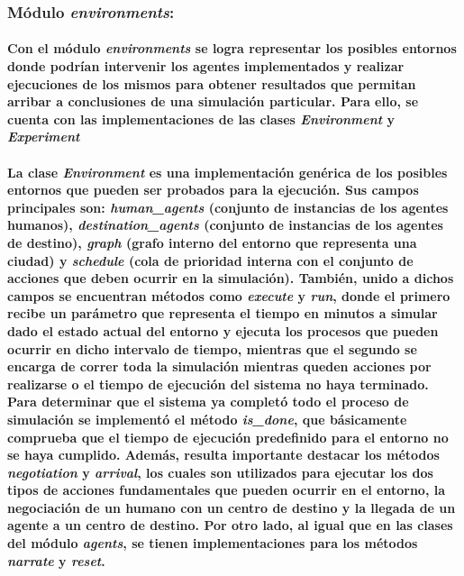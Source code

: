 \documentclass[12pt]{amsart}
\begin{document}
\subsubsection{Módulo \textit{environments}:}

\paragraph{Con el módulo \textit{environments} se logra representar los posibles entornos donde podrían intervenir los agentes implementados y realizar ejecuciones de los mismos para obtener resultados que permitan arribar a conclusiones de una simulación particular. Para ello, se cuenta con las implementaciones de las clases \textit{Environment} y \textit{Experiment}}

\paragraph{La clase \textit{Environment} es una implementación genérica de los posibles entornos que pueden ser probados para la ejecución. Sus campos principales son: \textit{human\_agents} (conjunto de instancias de los agentes humanos), \textit{destination\_agents} (conjunto de instancias de los agentes de destino), \textit{graph} (grafo interno del entorno que representa una ciudad) y \textit{schedule} (cola de prioridad interna con el conjunto de acciones que deben ocurrir en la simulación). También, unido a dichos campos se encuentran métodos como \textit{execute} y \textit{run}, donde el primero recibe un parámetro que representa el tiempo en minutos a simular dado el estado actual del entorno y ejecuta los procesos que pueden ocurrir en dicho intervalo de tiempo, mientras que el segundo se encarga de correr toda la simulación mientras queden acciones por realizarse o el tiempo de ejecución del sistema no haya terminado. Para determinar que el sistema ya completó todo el proceso de simulación se implementó el método \textit{is\_done}, que básicamente comprueba que el tiempo de ejecución predefinido para el entorno no se haya cumplido. Además, resulta importante destacar los métodos \textit{negotiation} y \textit{arrival}, los cuales son utilizados para ejecutar los dos tipos de acciones fundamentales que pueden ocurrir en el entorno, la negociación de un humano con un centro de destino y la llegada de un agente a un centro de destino. Por otro lado, al igual que en las clases del módulo \textit{agents}, se tienen implementaciones para los métodos \textit{narrate} y \textit{reset}.}
\end{document}
